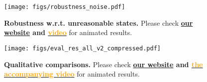 \begin{figure}[ht]
  \centering
  \vspace{-10pt}
  \texttt{[image: figs/robustness\_noise.pdf]}
  \vspace{-20pt}
  \caption{\footnotesize
  \textbf{Robustness w.r.t. unreasonable states. }
  Please check \textbf{\href{https://meowuu7.github.io/DexTrack/}{our website} and {\href{https://youtu.be/zru1Z-DaiWE}{\textcolor{orange}{video}}}} for animated results.
  }
  \label{fig_res_robustness}
  \vspace{-10pt}
\end{figure}


\begin{figure}[ht]
  \centering
  \texttt{[image: figs/eval\_res\_all\_v2\_compressed.pdf]}
  \caption{\footnotesize
  \textbf{Qualitative comparisons. }
  Please check \textbf{\href{https://meowuu7.github.io/DexTrack/}{our website} and {\href{https://youtu.be/zru1Z-DaiWE}{\textcolor{orange}{the accompanying video}}}} for animated results.
  }
  \label{fig_res}
  \vspace{-10pt}
\end{figure}





        

